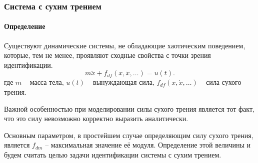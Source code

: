 \documentclass[10pt,utf8]{beamer}
\begin{document}
\begin{frame}
  \frametitle{Система с сухим трением}
  \framesubtitle{Определение}

  Существуют динамические системы, не обладающие хаотическим поведением,
  которые, тем не менее, проявляют сходные свойства с точки зрения идентификации.
  \begin{equation}
    m \ddot{x} + f_{df}( x, \dot{x}, \ldots)  = u(t).
    \label{atu:eq:dryfric_sys}
  \end{equation}
  где
  $m$ -- масса тела,
  $u(t)$ -- вынуждающая сила,
  $ f_{df}( x, \dot{x}, \ldots)  $ -- сила сухого трения.

  Важной особенностью при моделировании силы сухого трения является тот факт,
  что это силу невозможно корректно выразить аналитически.

  Основным параметром, в простейшем случае определяющим силу сухого
  трения, является $f_{dm}$ -- максимальная значение её модуля.
  Определение этой величины и будем считать целью задачи идентификации
  системы с сухим трением.

\end{frame}


\end{document}
